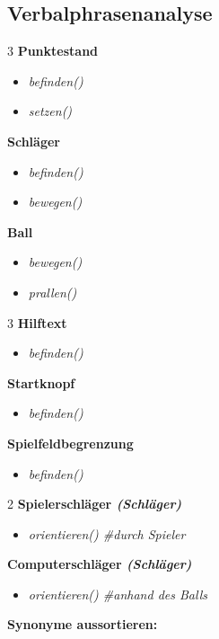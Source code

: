\documentclass[a4paper,12pt]{article}
\begin{document}
\subsection{Verbalphrasenanalyse}
\begin{multicols}{3}
\textbf{Punktestand}
\begin{itemize}
    \item[\textendash] \emph{befinden()}
    \item[\textendash] \emph{setzen()}
\end{itemize}
\textbf{Schläger}
\begin{itemize}
    \item[\textendash] \emph{befinden()}
    \item[\textendash] \emph{bewegen()}
\end{itemize}
\textbf{Ball}
\begin{itemize}
    \item[\textendash] \emph{bewegen()}
    \item[\textendash] \emph{prallen()}
\end{itemize}
\end{multicols}
\begin{multicols}{3}
\textbf{Hilftext}
\begin{itemize}
    \item[\textendash] \emph{befinden()}
\end{itemize}
\textbf{Startknopf}
\begin{itemize}
    \item[\textendash] \emph{befinden()}
\end{itemize}
\textbf{Spielfeldbegrenzung}
\begin{itemize}
    \item[\textendash] \emph{befinden()}
\end{itemize}
\end{multicols}
\begin{multicols}{2}
\textbf{Spielerschläger \textit{(Schläger)}}
\begin{itemize}
    \item[\textendash] \emph{orientieren() \#durch Spieler}
\end{itemize}
\textbf{Computerschläger \textit{(Schläger)}}
\begin{itemize}
    \item[\textendash] \emph{orientieren() \#anhand des Balls}
\end{itemize}
\end{multicols}
\vspace{0.5em}\textbf{Synonyme aussortieren:}
\end{document}
